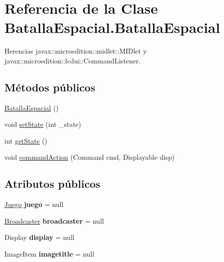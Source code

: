 \hypertarget{classBatallaEspacial_1_1BatallaEspacial}{
\section{Referencia de la Clase BatallaEspacial.BatallaEspacial}
\label{classBatallaEspacial_1_1BatallaEspacial}
}


Herencias javax::microedition::midlet::MIDlet y javax::microedition::lcdui::CommandListener.

\subsection*{Métodos públicos}
\begin{DoxyCompactItemize}
\item 
\hyperlink{classBatallaEspacial_1_1BatallaEspacial_a5b6354932793a595432f2ab294eed32e}{BatallaEspacial} ()
\item 
void \hyperlink{classBatallaEspacial_1_1BatallaEspacial_ac3b72f0ceadb25c1b239d3a89653a9f3}{setState} (int \_\-state)
\item 
int \hyperlink{classBatallaEspacial_1_1BatallaEspacial_abe949f69d2e15bd6f44bf2bf0029c1d4}{getState} ()
\item 
void \hyperlink{classBatallaEspacial_1_1BatallaEspacial_aaa3908c06ac2b5f077e3a363c8e6daf2}{commandAction} (Command cmd, Displayable disp)
\end{DoxyCompactItemize}
\subsection*{Atributos públicos}
\begin{DoxyCompactItemize}
\item 
\hypertarget{classBatallaEspacial_1_1BatallaEspacial_a0205c0e945fa6b8e3cf2c03cecf6b92b}{
\hyperlink{classBatallaEspacial_1_1Juego}{Juego} {\bfseries juego} = null}
\label{classBatallaEspacial_1_1BatallaEspacial_a0205c0e945fa6b8e3cf2c03cecf6b92b}

\item 
\hypertarget{classBatallaEspacial_1_1BatallaEspacial_a45a9036d096592547c49f74c95dd51dc}{
\hyperlink{classBatallaEspacial_1_1Broadcaster}{Broadcaster} {\bfseries broadcaster} = null}
\label{classBatallaEspacial_1_1BatallaEspacial_a45a9036d096592547c49f74c95dd51dc}

\item 
\hypertarget{classBatallaEspacial_1_1BatallaEspacial_a44da47d8a3a818c09681d32c46669bce}{
Display {\bfseries display} = null}
\label{classBatallaEspacial_1_1BatallaEspacial_a44da47d8a3a818c09681d32c46669bce}

\item 
\hypertarget{classBatallaEspacial_1_1BatallaEspacial_acf3da2820632117f62da085c116eac72}{
ImageItem {\bfseries imagetitle} = null}
\label{classBatallaEspacial_1_1BatallaEspacial_acf3da2820632117f62da085c116eac72}

\end{DoxyCompactItemize}
